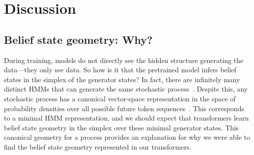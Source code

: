\documentclass{article}
\begin{document}
\section{Discussion}
\label{sec:Discussion}


\subsection{Belief state geometry: Why? }


During training, models do not directly see the hidden structure generating the data---they only see data.  So how is it that the pretrained model infers belief states in the simplex of the generator states?  In fact, there are infinitely many distinct HMMs that can generate the same stochastic process~\citep{Crut10a}. Despite this, any stochastic process has a canonical vector-space representation in the space of probability densities over all possible future token sequences~\citep{Uppe97a}. 
This corresponds to a minimal HMM representation, and we should expect 
that transformers learn 
belief state geometry in the simplex over these minimal generator states. This canonical geometry for a process provides an explanation for why we were able to find the belief state geometry represented in our transformers.


\end{document}
